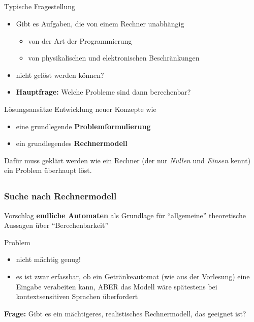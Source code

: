 \subsection*{}
\begin{frame}
  \frametitle{}

	\begin{block}{Typische Fragestellung}
\begin{itemize}
 	\item Gibt es Aufgaben, die von einem Rechner unabhängig
 		\begin{itemize}
       			\item von der Art der Programmierung
       			\item von physikalischen und elektronischen Beschränkungen
   		\end{itemize}
	\item nicht gelöst werden können?
	\item \textbf{Hauptfrage:} Welche Probleme sind dann berechenbar?
\end{itemize}
	\end{block}
	\pause
  \begin{block}{Lösungsansätze}
  Entwicklung neuer Konzepte wie
   \begin{itemize}
      \item eine grundlegende \textbf{Problemformulierung}
      \item ein grundlegendes \textbf{Rechnermodell}
    \end{itemize}
    Dafür muss geklärt werden wie ein Rechner (der nur \emph{Nullen} und \emph{Einsen} kennt) ein Problem überhaupt löst.
  \end{block}
\end{frame}


\subsection*{}
\begin{frame}
  \frametitle{Suche nach Rechnermodell}
  \pause
  \begin{block}{Vorschlag}
    \textbf{endliche Automaten} als Grundlage für "`allgemeine"' theoretische Aussagen über "`Berechenbarkeit"'
   \end{block}
    \pause
   \begin{block}{Problem}
    \begin{itemize}
      \item nicht mächtig genug!
      \item es ist zwar erfassbar, ob ein Getränkeautomat (wie aus der Vorlesung) eine Eingabe verabeiten kann, ABER das Modell wäre spätestens bei kontextsensitiven Sprachen überfordert
    \end{itemize}
  \end{block}
\pause
\textbf{Frage:} Gibt es ein mächtigeres, realistisches Rechnermodell, das geeignet ist?\end{frame}

